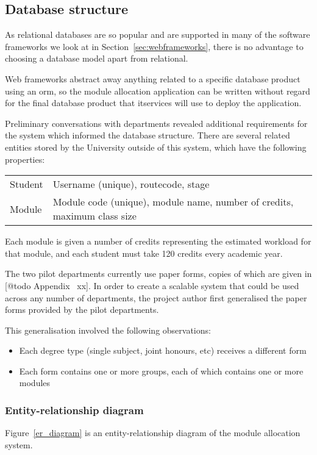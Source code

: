 
\subsection{Database structure}

As relational databases are so popular and are supported in many of the
software frameworks we look at in Section~\ref{sec:webframeworks}, there is no
advantage to choosing a database model apart from relational.

Web frameworks abstract away anything related to a specific database product
using an \gls{orm}, so the module allocation application can be written
without regard for the final database product that \gls{itservices} will use
to deploy the application.

Preliminary conversations with departments revealed additional requirements
for the system which informed the database structure. There are several
related entities stored by the University outside of this system, which have
the following properties:

\begin{tabular}{ l l }
  Student    & Username (unique), \gls{routecode}, \gls{stage} \\
  Module     & Module code (unique), module name, number of credits, maximum class size \\
\end{tabular}

Each module is given a number of credits representing the estimated workload
for that module, and each student must take 120 credits every academic year.

The two pilot departments currently use paper forms, copies of which are given
in [@todo Appendix~ xx]. In order to create a scalable system that could be
used across any number of departments, the project author first generalised
the paper forms provided by the pilot departments.

This generalisation involved the following observations:

\begin{itemize}
  \item Each degree type (single subject, joint honours, etc) receives a different form
  \item Each form contains one or more groups, each of which contains one or more modules
\end{itemize}

\subsubsection{Entity-relationship diagram}

Figure~\ref{er_diagram} is an entity-relationship diagram of the module
allocation system.


